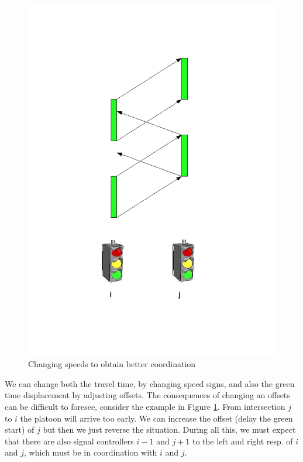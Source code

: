 \begin{figure}[ht]
\begin{center}
\includegraphics[scale=0.2]{change_offset.png} 
\end{center}
\caption{Changing speeds to obtain better coordination}
\label{fig:change_offset}
\end{figure}

We can change both the travel time, by changing speed signs, and also the green time displacement by adjusting offsets. The consequences of changing an offsets can be difficult to foresee, consider the example in Figure \ref{fig:change_offset}. From intersection $j$ to $i$ the platoon will arrive too early. We can increase the offset (delay the green start) of $j$ but then we just reverse the situation. During all this, we must expect that there are also signal controllers $i-1$ and $j+1$ to the left and right resp. of $i$ and $j$, which must be in coordination with $i$ and $j$.

